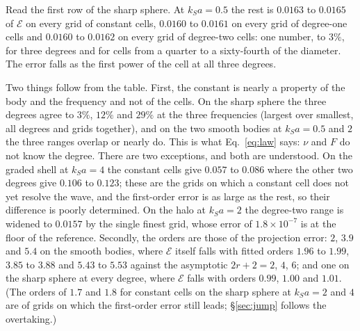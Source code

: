 \documentclass[11pt,a4paper]{article}
\newcommand{\cE}{\mathcal{E}}
\begin{document}
Read the first row of the sharp sphere. At $k_Sa=0.5$ the rest is $0.0163$ to $0.0165$ of $\cE$ on every
grid of constant cells, $0.0160$ to $0.0161$ on every grid of degree-one cells and $0.0160$ to $0.0162$
on every grid of degree-two cells: one number, to $3\%$, for three degrees and for cells from a quarter
to a sixty-fourth of the diameter. The error falls as the first power of the cell at all three degrees.

Two things follow from the table. First, the constant is nearly a property of the body and the
frequency and not of the cells. On the sharp sphere the three degrees agree to $3\%$, $12\%$ and $29\%$ at
the three frequencies (largest over smallest, all degrees and grids together), and on the two smooth
bodies at $k_Sa=0.5$ and $2$ the three ranges overlap or nearly do. This is what Eq.~\eqref{eq:law}
says: $\nu$ and $F$ do not know the degree. There are two exceptions, and both are understood. On the
graded shell at $k_Sa=4$ the constant cells give $0.057$ to $0.086$ where the other two degrees give
$0.106$ to $0.123$; these are the grids on which a constant cell does not yet resolve the wave, and the
first-order error is as large as the rest, so their difference is poorly determined. On the halo at
$k_Sa=2$ the degree-two range is widened to $0.0157$ by the single finest grid, whose error of
$1.8\times10^{-7}$ is at the floor of the reference. Secondly, the orders are those of the projection
error: $2$, $3.9$ and $5.4$ on the smooth bodies, where $\cE$ itself falls with fitted orders $1.96$ to $1.99$,
$3.85$ to $3.88$ and $5.43$ to $5.53$ against the asymptotic $2r+2=2$, $4$, $6$; and one on the sharp
sphere at every degree, where $\cE$ falls with orders $0.99$, $1.00$ and $1.01$. (The orders of $1.7$ and
$1.8$ for constant cells on the sharp sphere at $k_Sa=2$ and $4$ are of grids on which the first-order
error still leads; \S\ref{sec:jump} follows the overtaking.)
\end{document}
